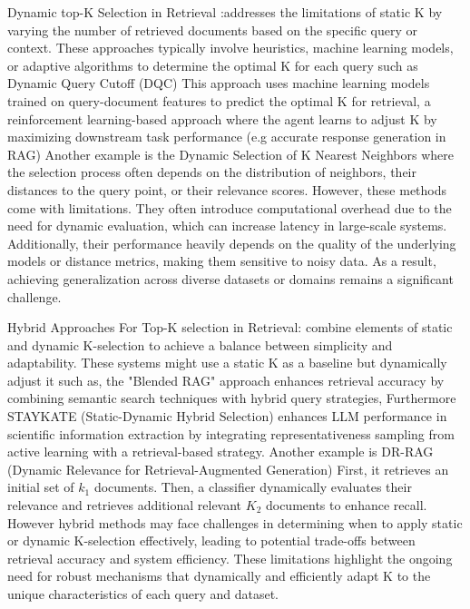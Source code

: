 \documentclass[review]{jair}
\begin{document}
Dynamic top-K Selection in Retrieval :addresses the limitations of static K by varying the number of retrieved documents based on the specific query or context. These approaches typically involve heuristics, machine learning models, or adaptive algorithms to determine the optimal K for each query such as Dynamic Query Cutoff (DQC)\cite{Culpepper2016} This approach uses machine learning models trained on query-document features to predict the optimal K for retrieval, a reinforcement learning-based approach\cite{Zhou2021} where the agent learns to adjust K by maximizing downstream task performance (e.g accurate response generation in RAG) Another example is the Dynamic Selection of K Nearest Neighbors \cite{DynamicKNN2012} where the selection process often depends on the distribution of neighbors, their distances to the query point, or their relevance scores.
However, these methods come with limitations. They often introduce computational overhead due to the need for dynamic evaluation, which can increase latency in large-scale systems. Additionally, their performance heavily depends on the quality of the underlying models or distance metrics, making them sensitive to noisy data. As a result, achieving generalization across diverse datasets or domains remains a significant challenge.


Hybrid Approaches For Top-K selection in Retrieval: combine elements of static and dynamic K-selection to achieve a balance between simplicity and adaptability. These systems might use a static K as a baseline but dynamically adjust it such as, the "Blended RAG"\cite{sawarkar2024blendedragimprovingrag} approach enhances retrieval accuracy by combining semantic search techniques with hybrid query strategies, Furthermore STAYKATE (Static-Dynamic Hybrid Selection)\cite{Zhu2024} enhances LLM performance in scientific information extraction by integrating representativeness sampling from active learning with a retrieval-based strategy. Another example is DR-RAG (Dynamic Relevance for Retrieval-Augmented Generation)\cite{hei2024drragapplyingdynamicdocument} First, it retrieves an initial set of $k_1$ documents. Then, a classifier dynamically evaluates their relevance and retrieves additional relevant $K_2$ documents to enhance recall. However hybrid methods may face challenges in determining when to apply static or dynamic K-selection effectively, leading to potential trade-offs between retrieval accuracy and system efficiency. These limitations highlight the ongoing need for robust mechanisms that dynamically and efficiently adapt K to the unique characteristics of each query and dataset.
\end{document}
